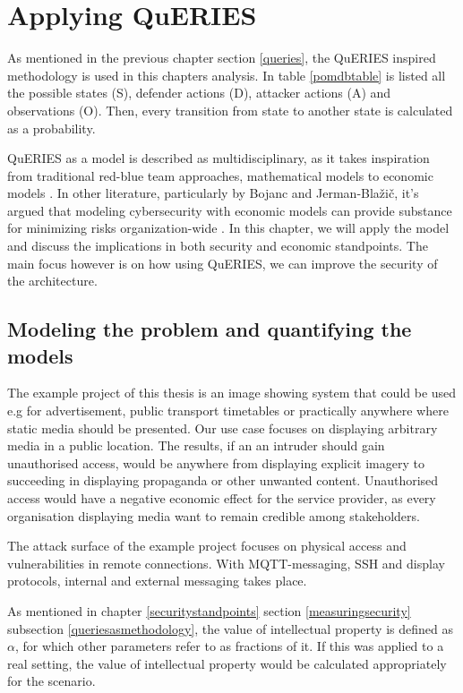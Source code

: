 \chapter{Applying QuERIES} \label{analysis}

As mentioned in the previous chapter section \ref{queries}, the
QuERIES inspired methodology is used in this chapters analysis. In table \ref{pomdbtable} is listed all the possible
states (S), defender actions (D), attacker actions (A) and
observations (O). Then, every transition from state to another state
is calculated as a probability.

QuERIES as a model is described as multidisciplinary, as it takes
inspiration from traditional red-blue team approaches, mathematical
models to economic models \cite{hughes2013quantitative}. In other
literature, particularly by Bojanc and Jerman-Blažič, it's argued
that modeling cybersecurity with economic models can provide substance
for minimizing risks organization-wide \cite{jerman2008economic}. In this chapter, we
will apply the model and discuss the implications in both security and
economic standpoints. The main focus however is on how using QuERIES, we can
improve the security of the architecture.


\section{Modeling the problem and quantifying the models} \label{modprob}

The example project of this thesis is an image showing system that
could be used e.g for advertisement, public transport timetables or
practically anywhere where static media should be presented. Our use
case focuses on displaying arbitrary media in a public location. The
results, if an an intruder should gain unauthorised access, would be
anywhere from displaying explicit imagery to succeeding in displaying
propaganda or other unwanted content. Unauthorised access would have a
negative economic effect for the service provider, as every
organisation displaying media want to remain credible among
stakeholders.

The attack surface of the example project focuses on physical access
and vulnerabilities in remote connections. With MQTT-messaging, SSH
and display protocols, internal and external messaging takes place.

As mentioned in chapter \ref{securitystandpoints} section
\ref{measuringsecurity} subsection \ref{queriesasmethodology}, the
value of intellectual property is defined as $\alpha$, for which other
parameters refer to as fractions of it. If this was applied to a real
setting, the value of intellectual property would be calculated
appropriately for the scenario.

